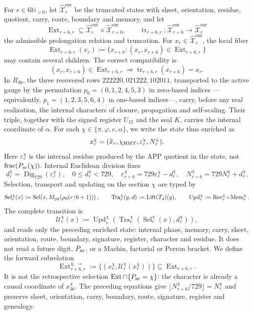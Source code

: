 For \(r\in6\mathbb N_{>0}\), let
\(\widehat{\mathcal X}^{\mathrm{enr}}_r\) be the truncated states with sheet,
orientation, residue, quotient, carry, route, boundary and memory, and let
\[
 \operatorname{Ext}_{r+6,r}\subseteq
 \widehat{\mathcal X}^{\mathrm{enr}}_r\times
 \widehat{\mathcal X}^{\mathrm{enr}}_{r+6},
 \qquad
 \operatorname{tr}_{r+6,r}:
 \widehat{\mathcal X}^{\mathrm{enr}}_{r+6}
 \longrightarrow
 \widehat{\mathcal X}^{\mathrm{enr}}_r
\]
the admissible prolongation relation and truncation. For
\(x_r\in\widehat{\mathcal X}^{\mathrm{enr}}_r\), the local fiber
\[
 \operatorname{Ext}_{r+6,r}(x_r)
 :=\{x_{r+6}:(x_r,x_{r+6})\in\operatorname{Ext}_{r+6,r}\}
\]
may contain several children. The correct compatibility is
\[
 (x_r,x_{r+6})\in\operatorname{Ext}_{r+6,r}
 \Longrightarrow
 \operatorname{tr}_{r+6,r}(x_{r+6})=x_r.
\]
In \(R_{36}\), the three recovered rows
\(222220,021222,102011\), transported to the active gauge by the permutation
\(p_0=(0,1,2,4,5,3)\) in zero-based indices ---equivalently,
\(p_1=(1,2,3,5,6,4)\) in one-based indices---, carry, before any
real realization, the internal characters
of closure, propagation and self-scaling. Their triple, together with the
signed register \(U_{12}\) and the seal \(K\), carries the internal coordinate of
\(\alpha\). For each
\(\chi\in\{\pi,\varphi,e,\alpha\}\), we write the state thus enriched
as
\[
 x_r^\chi=(\widetilde x_r,\chi_{\rm HMT},
            \varepsilon_r^\chi,N_r^\chi).
\]
Here \(\varepsilon_r^\chi\) is the internal residue produced by the APP
quotient in the state, not \(\operatorname{frac}(P_{\rm ar}(\chi))\). Internal Euclidean
division fixes
\[
 d_r^\chi=\operatorname{Dig}_{729}(\varepsilon_r^\chi),
 \quad 0\le d_r^\chi<729,
 \quad
 \varepsilon_{r+6}^\chi=729\varepsilon_r^\chi-d_r^\chi,
 \quad
 N_{r+6}^\chi=729N_r^\chi+d_r^\chi.
\]
Selection, transport and updating on the section
\(\chi\) are typed by
\[
 \operatorname{Sel}_r^\chi(x)
 :=\operatorname{Sel}\!\left(
 x,M_{\rm ph}(\rho_9(r/6+1))\right),
 \qquad
 \operatorname{Tra}_r^\chi(y,d):=\operatorname{Lift}(T_d)(y),
 \qquad
 \operatorname{Upd}_r^\chi:=\operatorname{Rec}_r^\chi\circ
 \operatorname{Mem}_r^\chi.
\]
The complete transition is
\[
 \mathcal U_r^\chi(x)
 :=\operatorname{Upd}_r^\chi\!\left(
  \operatorname{Tra}_r^\chi\!\left(
   \operatorname{Sel}_r^\chi(x),d_r^\chi
  \right)\right),
\]
and reads only the preceding enriched state: internal phase, memory, carry, sheet,
orientation, route, boundary, signature, register, character and residue.
It does not read a future digit, \(P_{\rm ar}\), or a Machin,
factorial or Perron bracket. We define the forward subrelation
\[
 \operatorname{Ext}^{\chi,\rightarrow}_{r+6,r}
 :=\{(x_r^\chi,\mathcal U_r^\chi(x_r^\chi))\}
 \subseteq\operatorname{Ext}_{r+6,r}.
\]
It is not the retrospective selection
\(\operatorname{Ext}\cap\{P_{\rm ar}=\chi\}\): the character is already a
causal coordinate of \(x_{36}^\chi\). The preceding equations give
\(\lfloor N_{r+6}^\chi/729\rfloor=N_r^\chi\) and preserve sheet, orientation,
carry, boundary, route, signature, register and genealogy.

